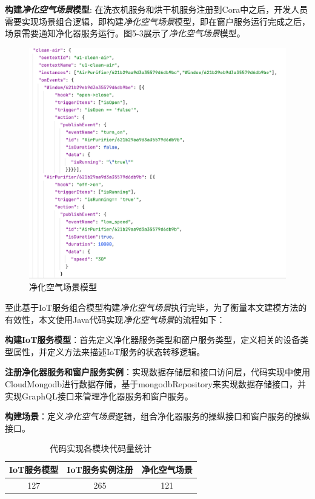 \documentclass[winfonts,master,twoside]{njuthesis}
\begin{document}
\textbf{构建\textit{净化空气场景}模型}: 在洗衣机服务和烘干机服务注册到Cora中之后，开发人员需要实现场景组合逻辑，即构建\textit{净化空气场景}模型，即在窗户服务运行完成之后，场景需要通知净化器服务运行。图5-3展示了\textit{净化空气场景}模型。
\begin{figure}
	\centering
	\includegraphics[width=1.0\textwidth]{figure/5-experiment/clean-air-context.png}
	\caption{净化空气场景模型}
	\label{ontransact-impl}
\end{figure}

至此基于IoT服务组合模型构建\textit{净化空气场景}执行完毕，为了衡量本文建模方法的有效性，本文使用Java代码实现\textit{净化空气场景}的流程如下：

\textbf{构建IoT服务模型}：首先定义净化器服务类型和窗户服务类型，定义相关的设备类型属性，并定义方法来描述IoT服务的状态转移逻辑。

\textbf{注册净化器服务和窗户服务实例}：实现数据存储层和接口访问层，代码实现中使用CloudMongodb进行数据存储，基于mongodbRepository来实现数据存储接口，并实现GraphQL接口来管理净化器服务和窗户服务。

\textbf{构建场景}：定义\textit{净化空气场景}逻辑，组合净化器服务的操纵接口和窗户服务的操纵接口。

\begin{table}[!htbp]
\centering
\begin{tabular}{|c|c|c|}
\hline
IoT服务模型 & IoT服务实例注册& 净化空气场景\\
\hline
127 & 265 & 121 \\
\hline
\end{tabular}
\caption{代码实现各模块代码量统计}
\end{table}
\end{document}
